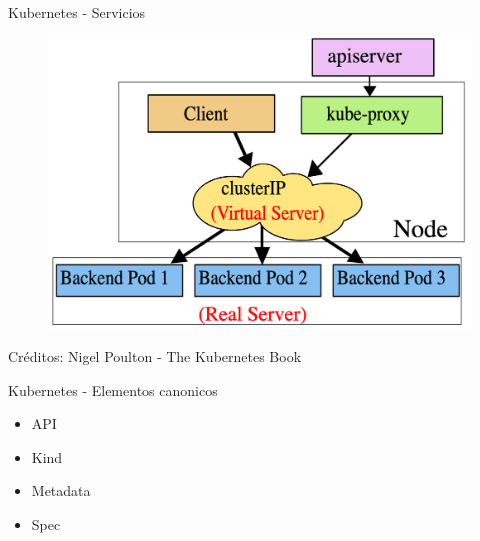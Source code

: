 \documentclass[aspectratio=169]{beamer}
\begin{document}
\begin{frame}{Kubernetes - Servicios}
    \begin{figure}
        \centering
        \includegraphics[width=0.55\linewidth]{Images/kubeservice2.png}
    \end{figure}
Créditos: Nigel Poulton - The Kubernetes Book
\end{frame}



\begin{frame}{Kubernetes - Elementos canonicos}

    \begin{itemize}
        \item API
        \item Kind
        \item Metadata
 \item Spec
    \end{itemize}

\end{frame}
\end{document}
